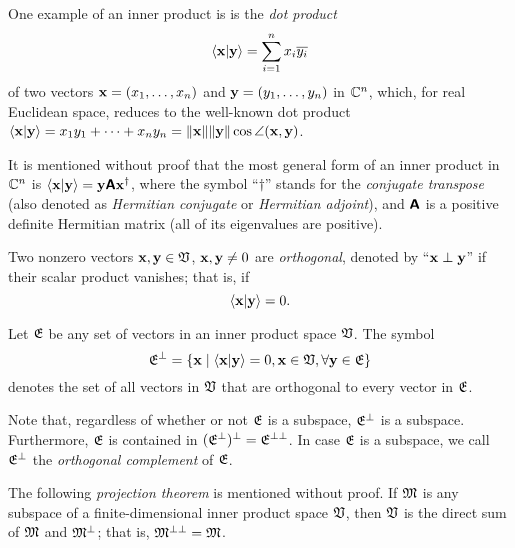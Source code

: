 {
\color{blue}
\bexample
One example of an inner product is is the
{\em dot product}
\begin{equation}
\langle  {\bf x} \vert {\bf y} \rangle
=
\sum_{i=1}^n x_i\overline{y_i}
\end{equation}
of two vectors ${\bf x}=
(x_1,\ldots , x_n)$
and
${\bf y}=
(y_1,\ldots , y_n)$ in ${\Bbb C}^n$,
which, for real Euclidean space,  reduces to the well-known dot product
$\langle  {\bf x} \vert {\bf y} \rangle
=
{x_1}y_1 + \cdots + {x_n}y_n  = \| {\bf x}\| \| {\bf y}\| \cos \angle ({\bf x},{\bf y})$.


It is mentioned without proof that the most general form of an inner product in ${\Bbb C}^n$
is
$\langle  {\bf x} \vert {\bf y} \rangle
=  {\bf y} \textsf{\textbf{A}} {\bf x}^\dagger$,
where the symbol ``$\dagger$'' stands for the {\em conjugate transpose} (also denoted as
{\em Hermitian conjugate} or {\em Hermitian adjoint}),
and $ \textsf{\textbf{A}} $ is a positive definite Hermitian matrix (all of its eigenvalues are positive).
\eexample
}

Two nonzero vectors $  {\bf x} , {\bf y} \in {\frak V}$,  $  {\bf x},   {\bf y}\neq 0$
are {\em orthogonal}, denoted by ``${\bf x} \perp {\bf y}$''
if their scalar product vanishes; that is, if
\begin{equation}
\langle  {\bf x} \vert {\bf y} \rangle   = 0.
\end{equation}


Let ${\frak E}$ be any set of vectors in an inner product space ${\frak V}$.
The symbol
\begin{equation}
{\frak E}^\perp  = \left\{ {\bf x}\mid  \langle  {\bf x} \vert {\bf y} \rangle=0,  {\bf x} \in {\frak V},
\forall {\bf y} \in {\frak E} \right\}
\end{equation}
 denotes the set of all vectors in  ${\frak V}$ that are
orthogonal to every vector in  ${\frak E}$.

Note that, regardless of whether or not ${\frak E}$ is a subspace,
${\frak E}^\perp$ is a subspace.
Furthermore,
${\frak E}$  is contained in $({\frak E}^\perp)^\perp= {\frak E}^{\perp\perp}$.
In case ${\frak E}$ is a subspace, we call ${\frak E}^\perp$
the {\em orthogonal complement}
of ${\frak E}$.

The following {\em projection theorem}
is mentioned without proof.
If ${\frak M}$ is any subspace of a finite-dimensional inner product space ${\frak V}$,
then ${\frak V}$ is the direct sum of ${\frak M}$ and ${\frak M}^\perp$;
that is, ${\frak M}^{\perp \perp}={\frak M}$.

